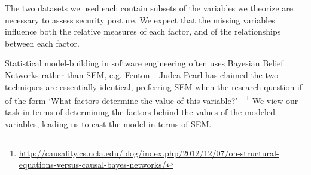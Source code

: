 The two datasets we used each contain subsets of the variables we theorize are necessary to assess security posture. We expect that the missing variables influence both the relative measures of each factor, and of the relationships between each factor. 

Statistical model-building in software engineering often uses Bayesian Belief Networks rather than SEM, e.g. Fenton~\cite{fenton2012risk}. Judea Pearl has claimed the two techniques are essentially identical, preferring SEM when the research question if of the form `What factors determine the value of this variable?' - \footnote{\url{http://causality.cs.ucla.edu/blog/index.php/2012/12/07/on-structural-equations-versus-causal-bayes-networks/}} We view our task in terms of determining the factors behind the values of the modeled variables, leading us to cast the model in terms of SEM.